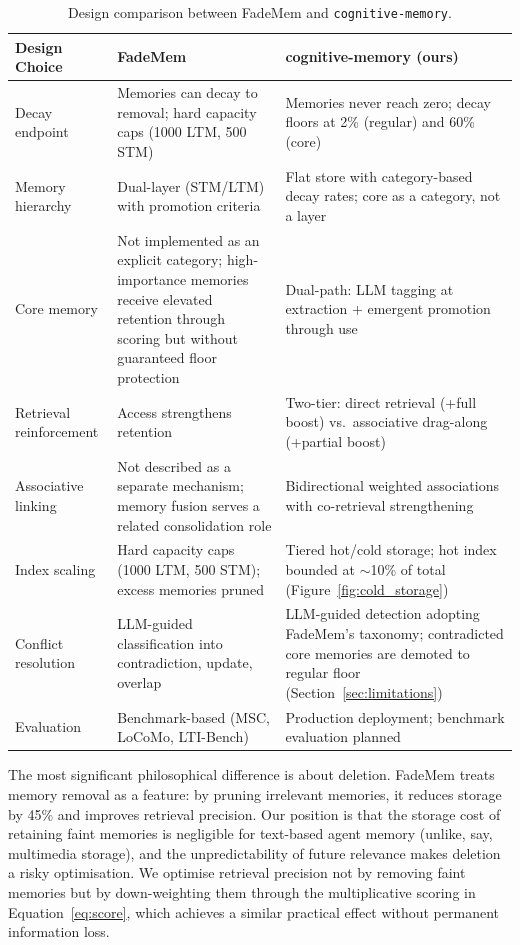 \documentclass[11pt,a4paper]{article}
\begin{document}
\begin{table}[h]
\centering
\small
\begin{tabular}{@{}p{3cm}p{5.5cm}p{5.5cm}@{}}
\toprule
\textbf{Design Choice} & \textbf{FadeMem} & \textbf{cognitive-memory (ours)} \\
\midrule
Decay endpoint & Memories can decay to removal; hard capacity caps (1000 LTM, 500 STM) & Memories never reach zero; decay floors at 2\% (regular) and 60\% (core) \\
\addlinespace
Memory hierarchy & Dual-layer (STM/LTM) with promotion criteria & Flat store with category-based decay rates; core as a category, not a layer \\
\addlinespace
Core memory & Not implemented as an explicit category; high-importance memories receive elevated retention through scoring but without guaranteed floor protection & Dual-path: LLM tagging at extraction + emergent promotion through use \\
\addlinespace
Retrieval reinforcement & Access strengthens retention & Two-tier: direct retrieval (+full boost) vs.\ associative drag-along (+partial boost) \\
\addlinespace
Associative linking & Not described as a separate mechanism; memory fusion serves a related consolidation role & Bidirectional weighted associations with co-retrieval strengthening \\
\addlinespace
Index scaling & Hard capacity caps (1000 LTM, 500 STM); excess memories pruned & Tiered hot/cold storage; hot index bounded at $\sim$10\% of total (Figure~\ref{fig:cold_storage}) \\
\addlinespace
Conflict resolution & LLM-guided classification into contradiction, update, overlap & LLM-guided detection adopting FadeMem's taxonomy; contradicted core memories are demoted to regular floor (Section~\ref{sec:limitations}) \\
\addlinespace
Evaluation & Benchmark-based (MSC, LoCoMo, LTI-Bench) & Production deployment; benchmark evaluation planned \\
\bottomrule
\end{tabular}
\caption{Design comparison between FadeMem and \texttt{cognitive-memory}.}
\label{tab:comparison}
\end{table}

The most significant philosophical difference is about deletion. FadeMem treats memory removal as a feature: by pruning irrelevant memories, it reduces storage by 45\% and improves retrieval precision. Our position is that the storage cost of retaining faint memories is negligible for text-based agent memory (unlike, say, multimedia storage), and the unpredictability of future relevance makes deletion a risky optimisation. We optimise retrieval precision not by removing faint memories but by down-weighting them through the multiplicative scoring in Equation~\ref{eq:score}, which achieves a similar practical effect without permanent information loss.
\end{document}
